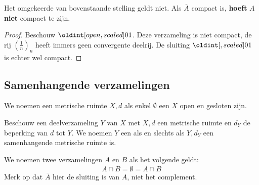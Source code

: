 \documentclass[main.tex]{subfiles}
\begin{document}
\begin{tvb}
  Het omgekeerde van bovenstaande stelling geldt niet.
  Als $\overline{A}$ compact is, \textbf{hoeft} $A$ \textbf{niet} compact te zijn.

  \begin{proof}
    Beschouw $\interval[open]{0}{1}$.
    Deze verzameling is niet compact, de rij $\left(\frac{1}{n}\right)_{n}$ heeft immers geen convergente deelrij.
    De sluiting $\interval{0}{1}$ is echter wel compact.
  \end{proof}
\end{tvb}


\subsection{Samenhangende verzamelingen}
\label{sec:samenh-verz}

\begin{de}
  We noemen een metrische ruimte $X,d$  als enkel $\emptyset$ een $X$ open en gesloten zijn.
\end{de}

\begin{de}
  Beschouw een deelverzameling $Y$ van $X$ met $X,d$ een metrische ruimte en $d_{Y}$ de beperking van $d$ tot $Y$.
  We noemen $Y$ een  als en slechts als $Y,d_{Y}$ een samenhangende metrische ruimte is.
\end{de}
 
\begin{de}
  We noemen twee verzamelingen $A$ en $B$  als het volgende geldt:
  \[ A \cap \overline{B} = \emptyset = \overline{A} \cap B \]
  Merk op dat $\overline{A}$ hier de sluiting is van $A$, niet het complement.
\end{de}
\end{document}
